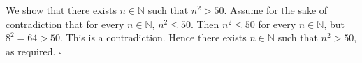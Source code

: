 We show that there exists $n \in \mathbb{N}$ such that $n^{2} > 50$.
Assume for the sake of contradiction that for every $n \in \mathbb{N}$, $n^{2} \leq 50$.
Then $n^{2} \leq 50$ for every $n \in \mathbb{N}$, but $8^{2} = 64 > 50$.
This is a contradiction.
Hence there exists $n \in \mathbb{N}$ such that $n^{2} > 50$, as required. \hfill$\square$